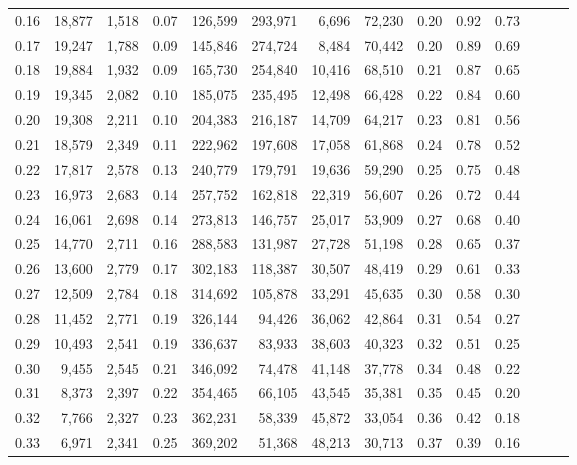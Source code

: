 \begin{tabular}{rrrrrrrrrrrrrr}
0.16 &  18,877 &  1,518 &  0.07 &  126,599 &  293,971 &   6,696 &  72,230 &  0.20 &  0.92 &      0.73 \\
0.17 &  19,247 &  1,788 &  0.09 &  145,846 &  274,724 &   8,484 &  70,442 &  0.20 &  0.89 &      0.69 \\
0.18 &  19,884 &  1,932 &  0.09 &  165,730 &  254,840 &  10,416 &  68,510 &  0.21 &  0.87 &      0.65 \\
0.19 &  19,345 &  2,082 &  0.10 &  185,075 &  235,495 &  12,498 &  66,428 &  0.22 &  0.84 &      0.60 \\
0.20 &  19,308 &  2,211 &  0.10 &  204,383 &  216,187 &  14,709 &  64,217 &  0.23 &  0.81 &      0.56 \\
0.21 &  18,579 &  2,349 &  0.11 &  222,962 &  197,608 &  17,058 &  61,868 &  0.24 &  0.78 &      0.52 \\
0.22 &  17,817 &  2,578 &  0.13 &  240,779 &  179,791 &  19,636 &  59,290 &  0.25 &  0.75 &      0.48 \\
0.23 &  16,973 &  2,683 &  0.14 &  257,752 &  162,818 &  22,319 &  56,607 &  0.26 &  0.72 &      0.44 \\
0.24 &  16,061 &  2,698 &  0.14 &  273,813 &  146,757 &  25,017 &  53,909 &  0.27 &  0.68 &      0.40 \\
0.25 &  14,770 &  2,711 &  0.16 &  288,583 &  131,987 &  27,728 &  51,198 &  0.28 &  0.65 &      0.37 \\
0.26 &  13,600 &  2,779 &  0.17 &  302,183 &  118,387 &  30,507 &  48,419 &  0.29 &  0.61 &      0.33 \\
0.27 &  12,509 &  2,784 &  0.18 &  314,692 &  105,878 &  33,291 &  45,635 &  0.30 &  0.58 &      0.30 \\
0.28 &  11,452 &  2,771 &  0.19 &  326,144 &   94,426 &  36,062 &  42,864 &  0.31 &  0.54 &      0.27 \\
0.29 &  10,493 &  2,541 &  0.19 &  336,637 &   83,933 &  38,603 &  40,323 &  0.32 &  0.51 &      0.25 \\
0.30 &   9,455 &  2,545 &  0.21 &  346,092 &   74,478 &  41,148 &  37,778 &  0.34 &  0.48 &      0.22 \\
0.31 &   8,373 &  2,397 &  0.22 &  354,465 &   66,105 &  43,545 &  35,381 &  0.35 &  0.45 &      0.20 \\
0.32 &   7,766 &  2,327 &  0.23 &  362,231 &   58,339 &  45,872 &  33,054 &  0.36 &  0.42 &      0.18 \\
0.33 &   6,971 &  2,341 &  0.25 &  369,202 &   51,368 &  48,213 &  30,713 &  0.37 &  0.39 &      0.16 \\

\end{tabular}

